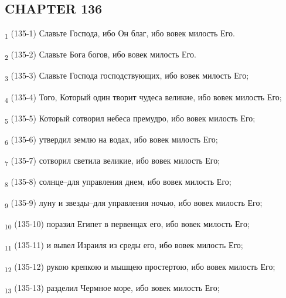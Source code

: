 \subsection{CHAPTER 136}
\begin{tcolorbox}
\textsubscript{1} (135-1) Славьте Господа, ибо Он благ, ибо вовек милость Его.
\end{tcolorbox}
\begin{tcolorbox}
\textsubscript{2} (135-2) Славьте Бога богов, ибо вовек милость Его.
\end{tcolorbox}
\begin{tcolorbox}
\textsubscript{3} (135-3) Славьте Господа господствующих, ибо вовек милость Его;
\end{tcolorbox}
\begin{tcolorbox}
\textsubscript{4} (135-4) Того, Который один творит чудеса великие, ибо вовек милость Его;
\end{tcolorbox}
\begin{tcolorbox}
\textsubscript{5} (135-5) Который сотворил небеса премудро, ибо вовек милость Его;
\end{tcolorbox}
\begin{tcolorbox}
\textsubscript{6} (135-6) утвердил землю на водах, ибо вовек милость Его;
\end{tcolorbox}
\begin{tcolorbox}
\textsubscript{7} (135-7) сотворил светила великие, ибо вовек милость Его;
\end{tcolorbox}
\begin{tcolorbox}
\textsubscript{8} (135-8) солнце--для управления днем, ибо вовек милость Его;
\end{tcolorbox}
\begin{tcolorbox}
\textsubscript{9} (135-9) луну и звезды--для управления ночью, ибо вовек милость Его;
\end{tcolorbox}
\begin{tcolorbox}
\textsubscript{10} (135-10) поразил Египет в первенцах его, ибо вовек милость Его;
\end{tcolorbox}
\begin{tcolorbox}
\textsubscript{11} (135-11) и вывел Израиля из среды его, ибо вовек милость Его;
\end{tcolorbox}
\begin{tcolorbox}
\textsubscript{12} (135-12) рукою крепкою и мышцею простертою, ибо вовек милость Его;
\end{tcolorbox}
\begin{tcolorbox}
\textsubscript{13} (135-13) разделил Чермное море, ибо вовек милость Его;
\end{tcolorbox}
